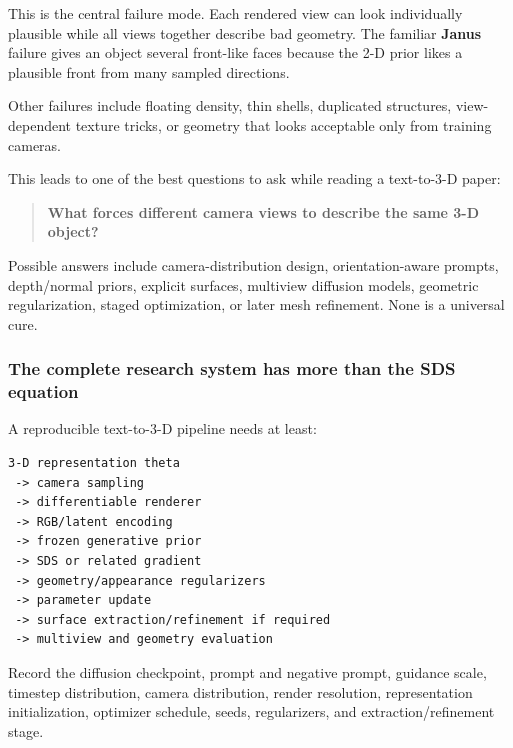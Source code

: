 \hypertarget{04-visual-computing-ii-ch035-a-2-d-prior-does-not-automatically-enforce-one-coherent-3-d-object}{}

This is the central failure mode. Each rendered view can look individually plausible while all views together describe bad geometry. The familiar \textbf{Janus} failure gives an object several front-like faces because the 2-D prior likes a plausible front from many sampled directions.

Other failures include floating density, thin shells, duplicated structures, view-dependent texture tricks, or geometry that looks acceptable only from training cameras.

This leads to one of the best questions to ask while reading a text-to-3-D paper:

\begin{quote}
\textbf{What forces different camera views to describe the same 3-D object?}
\end{quote}

Possible answers include camera-distribution design, orientation-aware prompts, depth/normal priors, explicit surfaces, multiview diffusion models, geometric regularization, staged optimization, or later mesh refinement. None is a universal cure.

\subsubsection{The complete research system has more than the SDS equation}\label{04-visual-computing-ii-ch035-the-complete-research-system-has-more-than-the-sds-equation}

\hypertarget{04-visual-computing-ii-ch035-the-complete-research-system-has-more-than-the-sds-equation}{}

A reproducible text-to-3-D pipeline needs at least:

\begin{verbatim}
3-D representation theta
 -> camera sampling
 -> differentiable renderer
 -> RGB/latent encoding
 -> frozen generative prior
 -> SDS or related gradient
 -> geometry/appearance regularizers
 -> parameter update
 -> surface extraction/refinement if required
 -> multiview and geometry evaluation
\end{verbatim}

Record the diffusion checkpoint, prompt and negative prompt, guidance scale, timestep distribution, camera distribution, render resolution, representation initialization, optimizer schedule, seeds, regularizers, and extraction/refinement stage.

